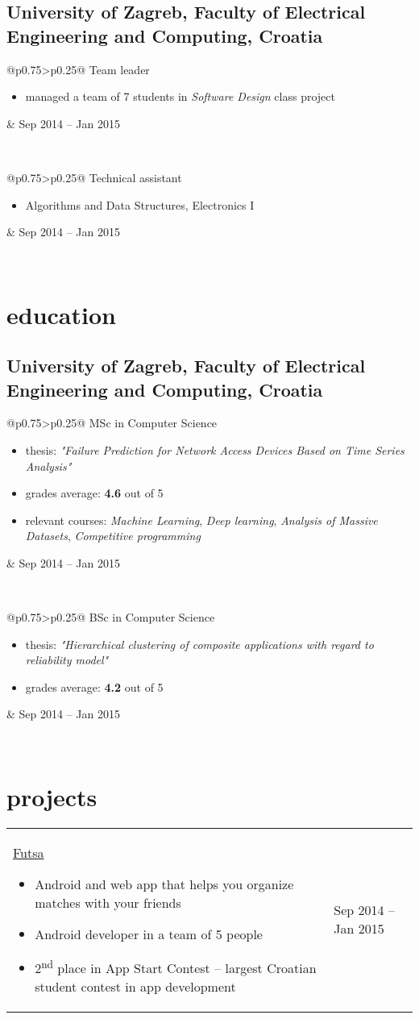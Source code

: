 \documentclass[a4paper]{article}
\makeatletter
\newlength{\tablewidth}
\newenvironment{period}[2]{%
\newcommand{\sarma}{#2}%
\setlength{\tablewidth}{\linewidth}
\addtolength{\tablewidth}{-2\tabcolsep}
\begin{tabular}{@{}p{0.75\tablewidth}>{\raggedleft\arraybackslash}p{0.25\tablewidth}@{}}%
#1 \newline
\begin{itemize}
}{%
\end{itemize} & \sarma \\%
\end{tabular}\\
}
\makeatother
\begin{document}
\subsection{University of Zagreb, Faculty of Electrical Engineering and Computing, Croatia}
\begin{period}{Team leader}{Sep 2014 -- Jan 2015}
    \item managed a team of 7 students in \textit{Software Design} class project
\end{period}
\begin{period}{Technical assistant}{Mar 2013 -- Jan 2014}
    \item Algorithms and Data Structures, Electronics I
\end{period}

\section{education}
\subsection{University of Zagreb, Faculty of Electrical Engineering and Computing, Croatia}
\begin{period}{MSc in Computer Science}{Oct 2015 -- Jul 2017}
    \item thesis:
        \textit{"Failure Prediction for Network Access Devices Based on Time Series Analysis"}
    \item grades average: \textbf{4.6} out of 5
    \item relevant courses:
        \textit{Machine Learning},
        \textit{Deep learning},
        \textit{Analysis of Massive Datasets},
        \textit{Competitive programming}
\end{period}
\begin{period}{BSc in Computer Science}{Oct 2012 -- Jul 2015}
	\item thesis:
        \textit{"Hierarchical clustering of composite applications with regard to reliability model"}
    \item grades average: \textbf{4.2} out of 5
\end{period}

\section{projects}

\begin{period}{\href{http://futsa.net}{Futsa}}{Feb 2017 -- Jun 2017}
	\item Android and web app that helps you organize matches with your friends
	\item Android developer in a team of 5 people
	\item
		2\textsuperscript{nd} place in App Start Contest -- largest Croatian student contest in app development

\end{period}
\end{document}
